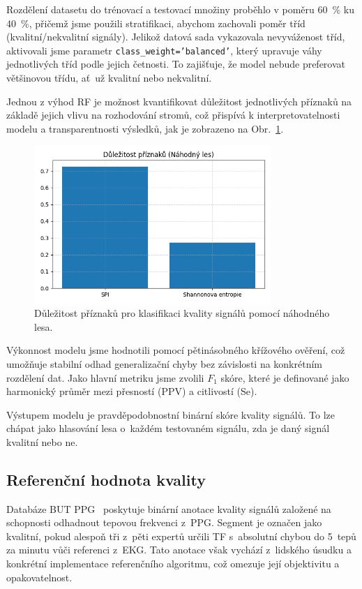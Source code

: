 Rozdělení datasetu do trénovací a testovací množiny proběhlo v poměru 60~\% ku 40~\%, přičemž jsme použili stratifikaci, abychom zachovali poměr tříd (kvalitní/nekvalitní signály).
Jelikož datová sada vykazovala nevyváženost tříd, aktivovali jsme parametr \texttt{class\_weight='balanced'}, který upravuje váhy jednotlivých tříd podle jejich četnosti.
To zajišťuje, že model nebude preferovat většinovou třídu, ať~už kvalitní nebo nekvalitní.

Jednou z výhod \acs{RF} je možnost kvantifikovat důležitost jednotlivých příznaků na základě jejich vlivu na rozhodování stromů, což přispívá k interpretovatelnosti modelu a transparentnosti výsledků, jak je zobrazeno na Obr.~\ref{fig:hjorth_feature_importance}.

\begin{figure}[ht]
	\centering
	\includegraphics[width=0.8\textwidth]{./obrazky/quality/feature_importance.png}
	\caption[Důležitost příznaků pro klasifikaci kvality signálů pomocí náhodného lesa]{Důležitost příznaků pro klasifikaci kvality signálů pomocí náhodného lesa.}
	\label{fig:hjorth_feature_importance}
\end{figure}

Výkonnost modelu jsme hodnotili pomocí pětinásobného křížového ověření, což umožňuje stabilní odhad generalizační chyby bez závislosti na konkrétním rozdělení dat.
Jako hlavní metriku jsme zvolili $F_1$ skóre, které je definované jako harmonický průměr mezi přesností (\acs{PPV}) a citlivostí (\acs{Se}).

Výstupem modelu je pravděpodobnostní binární skóre kvality signálů.
To lze chápat jako hlasování lesa o~každém testovaném signálu, zda je daný signál kvalitní nebo ne.

\subsection*{Referenční hodnota kvality}
\label{subsec:referencni_hodnota_kvality}
Databáze \acs{BUT PPG}~\cite{BUT_PPG,BUT_PPG_database} poskytuje binární anotace kvality signálů založené na schopnosti odhadnout tepovou frekvenci z~\acs{PPG}.
Segment je označen jako kvalitní, pokud alespoň tři z~pěti expertů určili \acs{TF} s~absolutní chybou do 5~tepů za minutu vůči referenci z~\acs{EKG}.
Tato anotace však vychází z~lidského úsudku a konkrétní implementace referenčního algoritmu, což omezuje její objektivitu a opakovatelnost.

